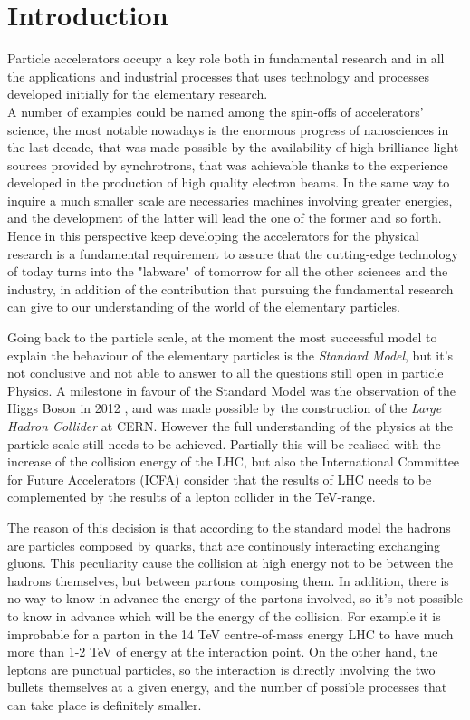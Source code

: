 \chapter{Introduction}
Particle accelerators occupy a key role both in fundamental research and in all the applications and industrial processes that uses technology and processes developed initially for the elementary research.\\
A number of examples could be named among the spin-offs of accelerators' science, the most notable nowadays is the enormous progress of nanosciences in the last decade, that was made possible by the availability of high-brilliance light sources provided by synchrotrons, that was achievable thanks to the experience developed in the production of high quality electron beams. In the same way to inquire a much smaller scale are necessaries machines involving greater energies, and the development of the latter will lead the one of the former and so forth.
 Hence in this perspective keep developing the accelerators for the physical research is a fundamental requirement to assure that the cutting-edge technology of today turns into the "labware" of tomorrow for all the other sciences and the industry, in addition of the contribution that pursuing the fundamental research can give to our understanding of the world of the elementary particles.

Going back to the particle scale, at the moment the most successful model to explain the behaviour of the elementary particles is the \textit{Standard Model}, but it's not conclusive and not able to answer to all the questions still open in particle Physics. A milestone in favour of the Standard Model was the observation of the Higgs Boson in 2012 \cite{CMS:higgs,ATLAS:higgs}, and was made possible by the construction of the \textit{Large Hadron Collider} at CERN\cite{LHC:design}. However the full understanding of the physics at the particle scale still needs to be achieved. Partially this will be realised with the increase of the collision energy of the LHC, but also the International Committee for Future Accelerators (ICFA) consider that the results of LHC needs to be complemented by the results of a lepton collider in the TeV-range\cite{ICFA:linStat}.

The reason of this decision is that according to the standard model the hadrons are particles composed by quarks, that are continously interacting exchanging gluons. This peculiarity cause the collision at high energy not to be between the hadrons themselves, but between partons composing them. In addition, there is no way to know in advance the energy of the partons involved, so it's not possible to know in advance which will be the energy of the collision. For example it is improbable for a parton in the 14 TeV centre-of-mass energy LHC to have much more than 1-2 TeV of energy at the interaction point\cite{LHC:partonDistrib}. On the other hand, the leptons are punctual particles, so the interaction is directly involving the two bullets themselves at a given energy, and the number of possible processes that can take place is definitely smaller. 

